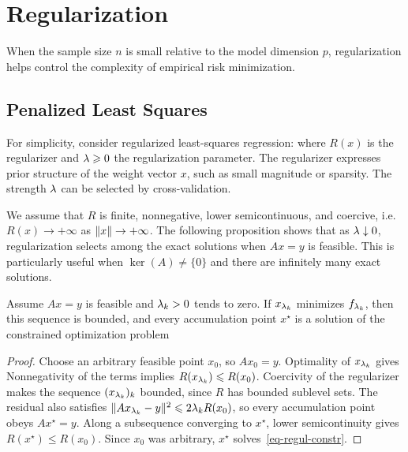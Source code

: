 

\section{Regularization}

When the sample size $n$ is small relative to the model dimension $p$, regularization helps control the complexity of empirical risk minimization.


\subsection{Penalized Least Squares}

For simplicity, consider regularized least-squares regression:
where $R(x)$ is the regularizer and $\lambda\geqslant 0$ the regularization parameter. 
%
The regularizer expresses prior structure of the weight vector $x$, such as small magnitude or sparsity. The strength $\lambda$ can be selected by cross-validation.

We assume that $R$ is finite, nonnegative, lower semicontinuous, and coercive, i.e. $R(x) \rightarrow +\infty$ as $\lVert x\rVert \rightarrow +\infty$.
%
The following proposition shows that as $\lambda\downarrow0$, regularization selects among the exact solutions when $Ax=y$ is feasible. This is particularly useful when $\ker(A)\neq\{0\}$ and there are infinitely many exact solutions.

\begin{prop}
	Assume $Ax=y$ is feasible and $\lambda_k>0$ tends to zero. If $x_{\lambda_k}$ minimizes $f_{\lambda_k}$, then this sequence is bounded, and every accumulation point $x^\star$ is a solution of the constrained optimization problem
\end{prop}


\begin{proof}
	Choose an arbitrary feasible point $x_0$, so $Ax_0=y$. Optimality of $x_{\lambda_k}$ gives
	Nonnegativity of the terms implies $R(x_{\lambda_k}) \leqslant  R(x_0)$. Coercivity of the regularizer makes the sequence $(x_{\lambda_k})_k$ bounded, since $R$ has bounded sublevel sets.
	The residual also satisfies $\lVert Ax_{\lambda_k}-y\rVert^2\leqslant2\lambda_k R(x_0)$, so every accumulation point obeys $Ax^\star = y$.
	Along a subsequence converging to $x^\star$, lower semicontinuity gives $R(x^\star)\leq R(x_0)$. Since $x_0$ was arbitrary, $x^\star$ solves~\eqref{eq-regul-constr}.
\end{proof}

